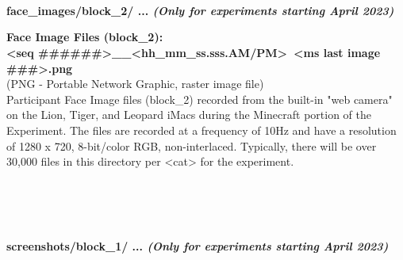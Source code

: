 \begin{description}
\begin{addmargin}[0em]{0em}
\end{addmargin} %


\textbf{\\\\\\}
\begin{addmargin}[0em]{0em} %
    \textbf{face\_images/block\_2/ ... \textit{(Only for experiments starting April 2023)}}

    \begin{addmargin}[1em]{0em} %
        \textbf{Face Image Files (block\_2):\\<seq \#\#\#\#\#\#>\_<yyyy-mm-dd>\_<hh\_mm\_ss.sss.AM/PM>~<ms last image \#\#\#>.png}\\
        (PNG - Portable Network Graphic, raster image file)\\
        Participant Face Image files (block\_2) recorded from the built-in "web camera" on the Lion, Tiger,
        and Leopard iMacs during the Minecraft portion of the Experiment.
        The files are recorded at a frequency of 10Hz and have a resolution of 1280 x 720, 8-bit/color RGB, non-interlaced.
        Typically, there will be over 30,000 files in this directory per <cat> for the experiment. 
    \end{addmargin} %

\end{addmargin} %


\textbf{\\\\\\}
\begin{addmargin}[0em]{0em} %
    \textbf{screenshots/block\_1/ ... \textit{(Only for experiments starting April 2023)}}


\end{addmargin}
\end{description}
